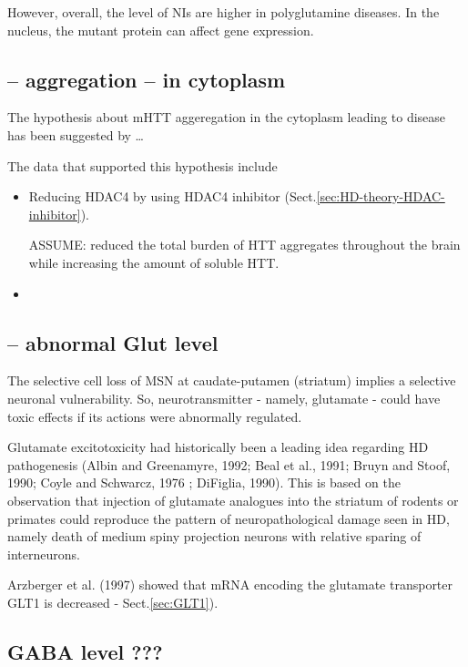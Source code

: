 However, overall, the level of NIs are higher in polyglutamine diseases.
In the nucleus, the mutant protein can affect gene expression.

\subsection{-- aggregation -- in cytoplasm}
\label{sec:HD-theory-mHTT-aggregation-in-cytoplasm}

The hypothesis about mHTT aggeregation in the cytoplasm leading to disease has
been suggested by \ldots

The data that supported this hypothesis include
\begin{itemize}
  \item  Reducing HDAC4 by using HDAC4 inhibitor
  (Sect.\ref{sec:HD-theory-HDAC-inhibitor}).
  
  ASSUME: reduced the total burden of HTT aggregates throughout the brain while
  increasing the amount of soluble HTT.
  
  \item 
  
\end{itemize}

\subsection{-- abnormal Glut level}
\label{sec:HD-theory-glutamate-toxicity}

The selective cell loss of MSN at caudate-putamen (striatum) implies a selective
neuronal vulnerability. So, neurotransmitter - namely, glutamate - could have
toxic effects if its actions were abnormally regulated.

Glutamate excitotoxicity had historically been a leading idea regarding HD
pathogenesis (Albin and Greenamyre, 1992; Beal et al., 1991; Bruyn and Stoof,
1990; Coyle and Schwarcz, 1976 ;  DiFiglia, 1990).
This is based on the observation that injection of glutamate analogues into the
striatum of rodents or primates could reproduce the pattern of neuropathological
damage seen in HD, namely death of medium spiny projection neurons with relative
sparing of interneurons.

Arzberger et al. (1997) showed that mRNA encoding the glutamate transporter GLT1
is decreased - Sect.\ref{sec:GLT1}).

\subsection{GABA level ???}
\label{sec:HD-theory-neurotransmitter}

